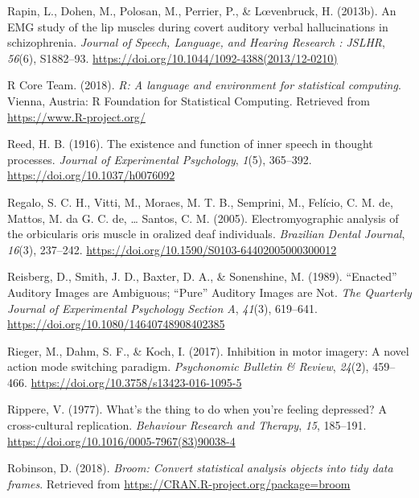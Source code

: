 \documentclass[a4paper,12pt,twoside,openright,oldfontcommands,final]{memoir}
\begin{document}
\leavevmode\hypertarget{ref-Rapin2013}{}%
Rapin, L., Dohen, M., Polosan, M., Perrier, P., \& Lœvenbruck, H. (2013b). An EMG study of the lip muscles during covert auditory verbal hallucinations in schizophrenia. \emph{Journal of Speech, Language, and Hearing Research : JSLHR}, \emph{56}(6), S1882--93. \url{https://doi.org/10.1044/1092-4388(2013/12-0210)}

\leavevmode\hypertarget{ref-R-base}{}%
R Core Team. (2018). \emph{R: A language and environment for statistical computing}. Vienna, Austria: R Foundation for Statistical Computing. Retrieved from \url{https://www.R-project.org/}

\leavevmode\hypertarget{ref-reed_existence_1916}{}%
Reed, H. B. (1916). The existence and function of inner speech in thought processes. \emph{Journal of Experimental Psychology}, \emph{1}(5), 365--392. \url{https://doi.org/10.1037/h0076092}

\leavevmode\hypertarget{ref-regalo_electromyographic_2005}{}%
Regalo, S. C. H., Vitti, M., Moraes, M. T. B., Semprini, M., Felício, C. M. de, Mattos, M. da G. C. de, \ldots{} Santos, C. M. (2005). Electromyographic analysis of the orbicularis oris muscle in oralized deaf individuals. \emph{Brazilian Dental Journal}, \emph{16}(3), 237--242. \url{https://doi.org/10.1590/S0103-64402005000300012}

\leavevmode\hypertarget{ref-reisberg_enacted_1989}{}%
Reisberg, D., Smith, J. D., Baxter, D. A., \& Sonenshine, M. (1989). ``Enacted'' Auditory Images are Ambiguous; ``Pure'' Auditory Images are Not. \emph{The Quarterly Journal of Experimental Psychology Section A}, \emph{41}(3), 619--641. \url{https://doi.org/10.1080/14640748908402385}

\leavevmode\hypertarget{ref-rieger_inhibition_2017}{}%
Rieger, M., Dahm, S. F., \& Koch, I. (2017). Inhibition in motor imagery: A novel action mode switching paradigm. \emph{Psychonomic Bulletin \& Review}, \emph{24}(2), 459--466. \url{https://doi.org/10.3758/s13423-016-1095-5}

\leavevmode\hypertarget{ref-Rippere1977}{}%
Rippere, V. (1977). What's the thing to do when you're feeling depressed? A cross-cultural replication. \emph{Behaviour Research and Therapy}, \emph{15}, 185--191. \url{https://doi.org/10.1016/0005-7967(83)90038-4}

\leavevmode\hypertarget{ref-R-broom}{}%
Robinson, D. (2018). \emph{Broom: Convert statistical analysis objects into tidy data frames}. Retrieved from \url{https://CRAN.R-project.org/package=broom}
\end{document}
